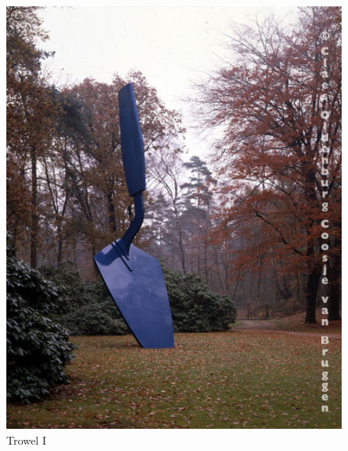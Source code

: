 \documentclass[12pt]{article}
\begin{document}
\begin{figure}
    \includegraphics[height=.95\textheight]{trowel.jpeg}
    \centering
    \caption{Trowel I \autocite{pic4}}
    \label{fig:trowel}
\end{figure}


\clearpage
\printbibliography
\end{document}

